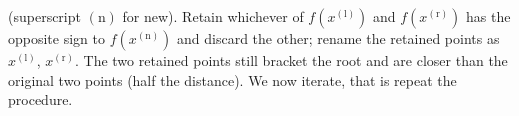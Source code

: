 

























\noindent
(superscript $(\mathrm{n})$ for new).
Retain whichever of \( f(x^{(\mathrm{l})}) \) and \( f(x^{(\mathrm{r})}) \) has the
opposite sign to \( f(x^{(\mathrm{n})}) \) and discard the other;
rename the retained points as \( x^{(\mathrm{l})} \), \( x^{(\mathrm{r})} \).
The two retained points still bracket the root and are closer than the original 
two points (half the distance). We now iterate, that is repeat the procedure.

